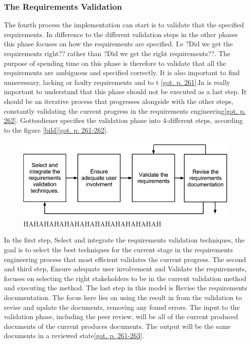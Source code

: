 \documentclass[a4paper]{article}
\begin{document}
\subsubsection{The Requirements Validation}
\label{subsub:the_requirements_validation}
The fourth process the implementation can start is to validate that the specified requirements. In difference to the different validation steps in the other phases this phase focuses on how the requirements are specified. I.e ?Did we get the requirements right?? rather than ?Did we get the right requirements??. The purpose of spending time on this phase is therefore to validate that all the requirements are ambiguous and specified correctly. It is also important to find unnecessary, lacking or faulty requirements and to t \ref{got. p. 261}.In is really important to understand that this phase should not be executed as a last step. It  should be an iterative process that progresses alongside with the other steps, constantly validating the current progress in the requirements engineering\ref{got. p. 262}. Gottesdiener specifies the validation phase into 4-different steps, according to the figure \ref{bild}\ref{got. p. 261-262}. 


\begin{figure}
	\centering
		\includegraphics[width=1\textwidth]{images/validations_model.png}
	\caption{HAHAHAHAHAHAHAHAHAHAHAHAHAH}
	\label{figure:validation}
\end{figure}


In the first step, Select and integrate the requirements validation techniques, the goal is to select the best techniques for the current stage in the requirements engineering process that most efficient validates the current progress. The second and third step, Ensure adequate user involvement and Validate the requirements, focuses on selecting the right stakeholders to be in the current validation method and executing the method. The last step in this model is Revise the requirements documentation. The focus here lies on using the result in from the validation to revise and update the documents, removing any found errors. The input to the validation phase, including the peer review, will be all of the current produced documents of the current produces documents. The output will be the same documents in a reviewed state\ref{got. p. 261-263}.
\end{document}
